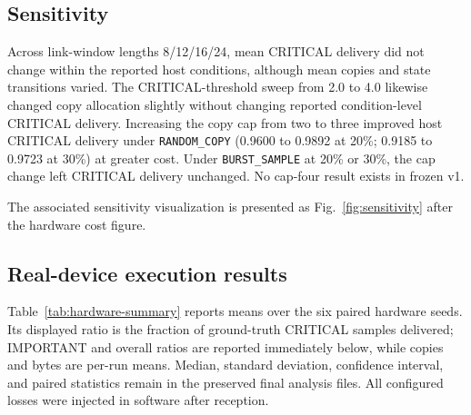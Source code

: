 \documentclass[11pt]{article}
\begin{document}
\subsection{Sensitivity}\label{sec:sensitivity}

Across link-window lengths 8/12/16/24, mean CRITICAL delivery did not change within the reported host conditions, although mean copies and state transitions varied. The CRITICAL-threshold sweep from 2.0 to 4.0 likewise changed copy allocation slightly without changing reported condition-level CRITICAL delivery. Increasing the copy cap from two to three improved host CRITICAL delivery under \texttt{RANDOM\_COPY} (0.9600 to 0.9892 at 20\%; 0.9185 to 0.9723 at 30\%) at greater cost. Under \texttt{BURST\_SAMPLE} at 20\% or 30\%, the cap change left CRITICAL delivery unchanged. No cap-four result exists in frozen v1.

The associated sensitivity visualization is presented as Fig.~\ref{fig:sensitivity} after the hardware cost figure.

\subsection{Real-device execution results}\label{sec:real-device-execution-results}

Table~\ref{tab:hardware-summary} reports means over the six paired hardware seeds. Its displayed ratio is the fraction of ground-truth CRITICAL samples delivered; IMPORTANT and overall ratios are reported immediately below, while copies and bytes are per-run means. Median, standard deviation, confidence interval, and paired statistics remain in the preserved final analysis files. All configured losses were injected in software after reception.
\end{document}

